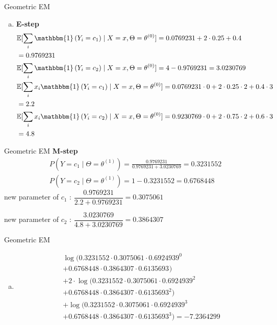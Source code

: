 \documentclass{beamer}\usepackage[]{graphicx}\usepackage[]{color}
\newcommand{\id}[1]{\mathbbm{1}\left(#1\right)}
\begin{document}
\begin{frame}{Geometric EM}
\small
\begin{enumerate}[c)]
\item \textbf{E-step}\begin{align*}
&\mathbb{E}[\sum_{i}\id{Y_{i}=c_{1}}\mid X=x, \Theta=\theta^{(0)}] = 0.0769231 + 
2\cdot 0.25 + 0.4 \\
&= 0.9769231 \\
&\mathbb{E}[\sum_{i}\id{Y_{i}=c_{2}}\mid X=x, \Theta=\theta^{(0)}] = 4 - 0.9769231 = 3.0230769 \\
&\mathbb{E}[\sum_{i}x_{i}\id{Y_{i}=c_{1}}\mid X=x, \Theta=\theta^{(0)}] = 0.0769231 \cdot 0 + 
2\cdot 0.25 \cdot 2 + 0.4 \cdot 3\\
&= 2.2 \\
&\mathbb{E}[\sum_{i}x_{i}\id{Y_{i}=c_{2}}\mid X=x, \Theta=\theta^{(0)}] = 0.9230769 \cdot 0 + 
2\cdot 0.75 \cdot 2 + 0.6 \cdot 3\\
&= 4.8
\end{align*}
\end{enumerate}
\end{frame}



\begin{frame}{Geometric EM}
\textbf{M-step}
\begin{align*}
&P(Y=c_{1}\mid \Theta = \theta^{(1)}) = \frac{0.9769231}{0.9769231 + 3.0230769} = 0.3231552 \\
&P(Y=c_{2}\mid \Theta = \theta^{(1)}) = 1 - 0.3231552
= 0.6768448 
\end{align*}
new parameter of $ c_{1} $ : $ \dfrac{0.9769231}{2.2 + 0.9769231} = 0.3075061 $\vspace{.5cm}

new parameter of $ c_{2} $ : $ \dfrac{3.0230769}{4.8 + 3.0230769} = 0.3864307 $
\end{frame}

\begin{frame}{Geometric EM}
\begin{enumerate}[d)]
\item \begin{align*}
&\log(0.3231552\cdot 0.3075061\cdot 0.6924939^{0}  \\
&+ 0.6768448 \cdot 0.3864307 \cdot 0.6135693^{}) \\
&+ 2\cdot \log(0.3231552\cdot 0.3075061 \cdot 0.6924939^{2} \\
&+ 0.6768448\cdot 0.3864307 \cdot 0.6135693^{2}) \\
&+ \log(0.3231552\cdot 0.3075061 \cdot 0.6924939^{3} \\
&+ 0.6768448\cdot 0.3864307 \cdot 0.6135693^{3})
= \ensuremath{-7.2364299} 
\end{align*}
\end{enumerate}
\end{frame}
\end{document}
